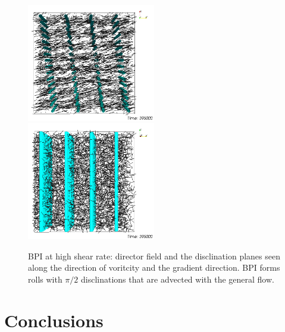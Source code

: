 \documentclass[aps,pre,twocolumn,groupedaddress]{revtex4-1}
\begin{document}
\begin{figure}[h]
\includegraphics[width=0.5\textwidth]{dir-op-z_395k_run916.png}
\includegraphics[width=0.5\textwidth]{dir-op-x_395k_run916.png}
\caption{BPI at high shear rate: director field and the disclination planes seen along the direction of voritcity and the gradient direction. BPI forms rolls with $\pi/2$ disclinations that are advected with the general flow.}
\label{fig10}
\end{figure}


\section{Conclusions}


%
\end{document}
